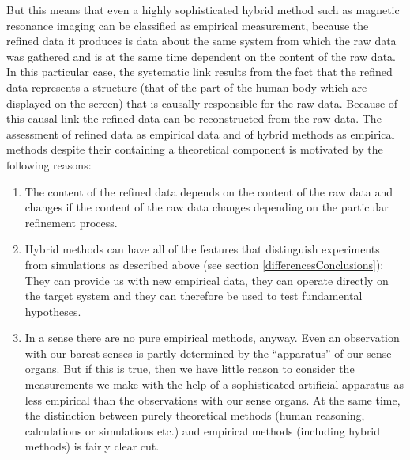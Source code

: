 \documentclass[onecollarge]{STJour}
\numberwithin{equation}{section}
\begin{document}
But this means that even a highly sophisticated hybrid method such as magnetic resonance imaging can be classified as empirical measurement, because the refined data it produces is data about the same system from which the raw data was gathered and is at the same time dependent on the content of the raw data. In this particular case, the systematic link results from the fact that the refined data represents a structure (that of the part of the human body which are displayed on the screen) that is causally responsible for the raw data. Because of this causal link the refined data can be reconstructed from the raw data. The assessment of refined data as empirical data and of hybrid methods as empirical methods despite their containing a theoretical component is motivated by the following reasons:

\begin{enumerate}

\item The content of the refined data depends on the content of the raw data and changes if the content of the raw data changes depending on the particular refinement process. 


\item Hybrid methods can have all of the features that distinguish experiments from simulations as described above (see section \ref{differencesConclusions}): They can provide us with new empirical data, they can operate directly on the target system and they can therefore be used to test fundamental hypotheses.

\item In a sense there are no pure empirical methods, anyway. Even an observation with our barest senses is partly determined by the ``apparatus'' of our sense organs. But if this is true, then we have little reason to consider the measurements we make with the help of a sophisticated artificial apparatus as less empirical than the observations with our sense organs. At the same time, the distinction between purely theoretical methods (human reasoning, calculations or simulations etc.) and empirical methods (including hybrid methods) is fairly clear cut. 

\end{enumerate}
\end{document}
